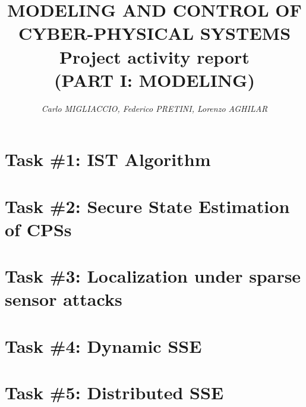 \documentclass[a4paper, 12pt]{article}
\begin{document}
    
    \title{
        \vspace{-2cm}
        \textbf{
        {\large{MODELING AND CONTROL OF CYBER-PHYSICAL SYSTEMS}}\\
        {\huge{Project activity report}}\\
        \normalsize{(PART I: MODELING)}
        }
    }
    
    \author{
        \textit{    
        Carlo MIGLIACCIO, 
        Federico PRETINI, Lorenzo AGHILAR}
    }
    
    \clearpage\maketitle
    \thispagestyle{empty}

    

    \section*{Task \#1: IST Algorithm}

    \section*{Task \#2: Secure State Estimation of CPSs}

    \section*{Task \#3: Localization under sparse sensor attacks}

    \section*{Task \#4: Dynamic SSE}

    \section*{Task \#5: Distributed SSE}
\end{document}
